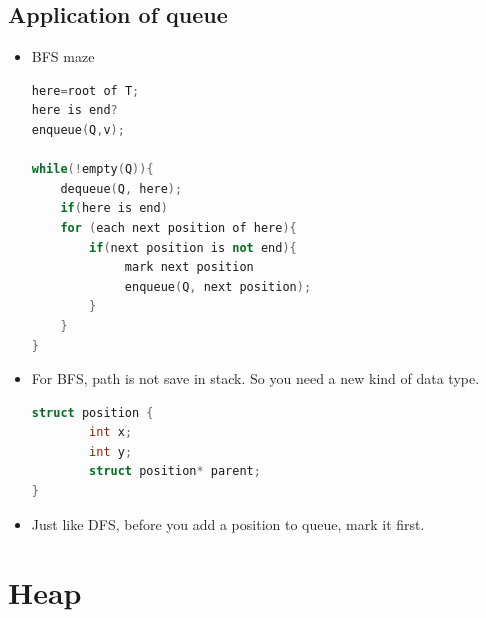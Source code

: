 \documentclass[a4paper,11pt,twoside]{book}
\begin{document}
\subsection{Application of queue}
\begin{itemize}
\item  BFS maze 
\begin{lstlisting}[frame=single, language=c++]
here=root of T;
here is end?
enqueue(Q,v);

while(!empty(Q)){
    dequeue(Q, here);
    if(here is end)
    for (each next position of here){
        if(next position is not end){
             mark next position
             enqueue(Q, next position);
        }
    }
}
\end{lstlisting}

\item For BFS, path is not save in stack. So you need a new kind of data type. 
\begin{lstlisting}[frame=single, language=c++]
struct position {
        int x;
        int y;
        struct position* parent;
}
\end{lstlisting}
\item Just like DFS, before you add a position to queue, mark it first. 

\end{itemize}



\section{Heap}
\end{document}
